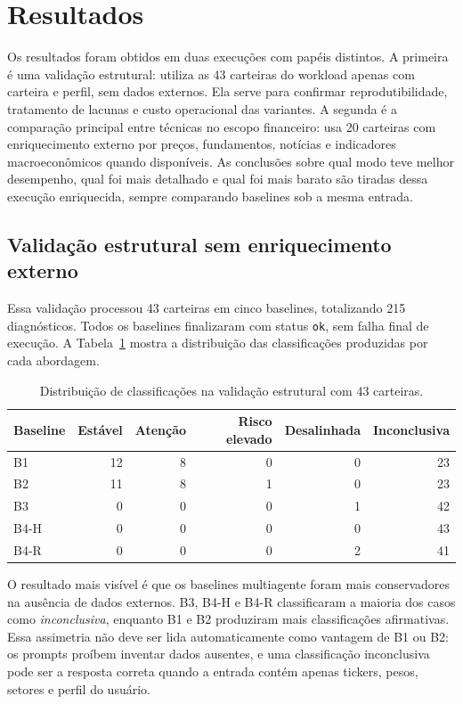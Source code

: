 \section{Resultados}
\label{sec:resultados}

Os resultados foram obtidos em duas execuções com papéis distintos. A
primeira é uma validação estrutural: utiliza as 43 carteiras do workload
apenas com carteira e perfil, sem dados externos. Ela serve para confirmar
reprodutibilidade, tratamento de lacunas e custo operacional das variantes. A
segunda é a comparação principal entre técnicas no escopo financeiro: usa
20 carteiras com enriquecimento externo por preços, fundamentos, notícias
e indicadores macroeconômicos quando disponíveis. As conclusões sobre qual
modo teve melhor desempenho, qual foi mais detalhado e qual foi mais barato são
tiradas dessa execução enriquecida, sempre comparando baselines sob a mesma
entrada.

\subsection{Validação estrutural sem enriquecimento externo}

Essa validação processou 43 carteiras em cinco baselines, totalizando
215 diagnósticos. Todos os baselines finalizaram com status \texttt{ok}, sem
falha final de execução. A Tabela~\ref{tab:classificacoes-estrutural} mostra a
distribuição das classificações produzidas por cada abordagem.

\begin{table}[!t]
\centering
\caption{Distribuição de classificações na validação estrutural com 43 carteiras.}
\label{tab:classificacoes-estrutural}
\begin{tabular}{@{}lrrrrr@{}}
\hline\hline
Baseline & Estável & Atenção & Risco elevado & Desalinhada & Inconclusiva \\
\hline
B1   & 12 & 8 & 0 & 0 & 23 \\
B2   & 11 & 8 & 1 & 0 & 23 \\
B3   &  0 & 0 & 0 & 1 & 42 \\
B4-H &  0 & 0 & 0 & 0 & 43 \\
B4-R &  0 & 0 & 0 & 2 & 41 \\
\hline\hline
\end{tabular}
\end{table}

O resultado mais visível é que os baselines multiagente foram mais
conservadores na ausência de dados externos. B3, B4-H e B4-R
classificaram a maioria dos casos como \textit{inconclusiva}, enquanto
B1 e B2 produziram mais classificações afirmativas. Essa assimetria não
deve ser lida automaticamente como vantagem de B1 ou B2: os prompts
proíbem inventar dados ausentes, e uma classificação inconclusiva pode
ser a resposta correta quando a entrada contém apenas tickers, pesos,
setores e perfil do usuário.

